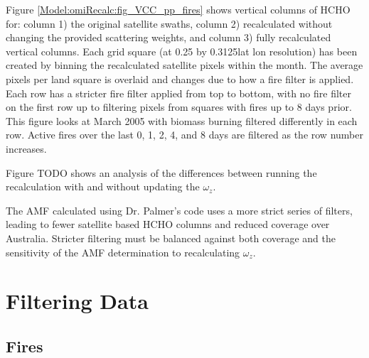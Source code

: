   Figure \ref{Model:omiRecalc:fig_VCC_pp_fires} shows vertical columns of HCHO for: column 1) the original satellite swaths, column 2) recalculated without changing the provided scattering weights, and column 3) fully recalculated vertical columns. 
  Each grid square (at 0.25 by 0.3125\degr lat lon resolution) has been created by binning the recalculated satellite pixels within the month.
  The average pixels per land square is overlaid and changes due to how a fire filter is applied.
  Each row has a stricter fire filter applied from top to bottom, with no fire filter on the first row up to filtering pixels from squares with fires up to 8 days prior.
  This figure looks at March 2005 with biomass burning filtered differently in each row.
  Active fires over the last 0, 1, 2, 4, and 8 days are filtered as the row number increases.
  
  Figure TODO shows an analysis of the differences between running the recalculation with and without updating the $\omega_z$.
  
  
  The AMF calculated using Dr. Palmer's code uses a more strict series of filters, leading to fewer satellite based HCHO columns and reduced coverage over Australia.
  Stricter filtering must be balanced against both coverage and the sensitivity of the AMF determination to recalculating $\omega_z$.
  

\section{Filtering Data}
  \label{Model:Filter}
  
  
  \subsection{Fires}
    \label{Model:Filter:fire}
    
